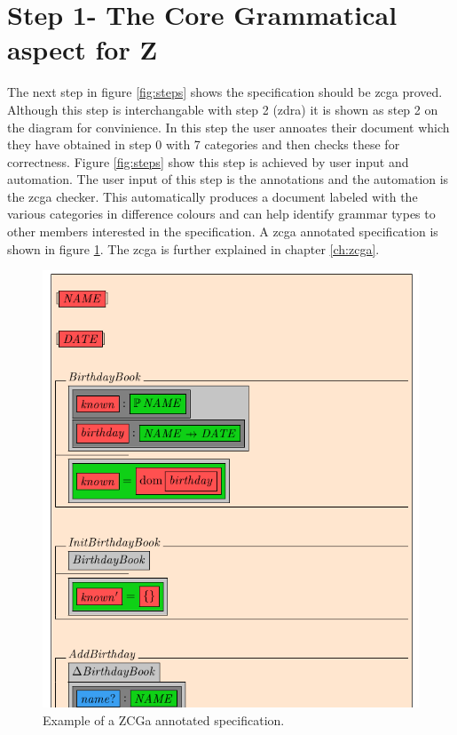 \section{Step 1- The Core Grammatical aspect for Z}

The next step in figure \ref{fig:steps} shows the specification should be \gls{zcga} proved. Although this step is interchangable with step 2 (\gls{zdra}) it is shown as step 2 on the diagram for convinience. In this step the user annoates their document which they have obtained in step 0 with 7 categories and then checks these for correctness. Figure \ref{fig:steps} show this step is achieved by user input and automation. The user input of this step is the annotations and the automation is the \gls{zcga} checker. This automatically produces a document labeled with the various categories in difference colours and can help identify grammar types to other members interested in the specification. A \gls{zcga} annotated specification is shown in figure \ref{fig:zcgaexample}. The \gls{zcga} is further explained in chapter \ref{ch:zcga}.

\begin{figure}[H]
 \begin{center}
 \includegraphics [scale=0.25]{Figures/Design/zcgaexample.png}
 \caption{Example of a ZCGa annotated specification.}
 \label{fig:zcgaexample}
\end{center}
\end{figure} 

